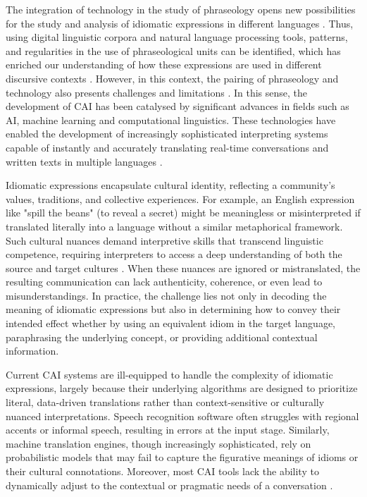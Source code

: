 The integration of technology in the study of phraseology opens new
possibilities for the study and analysis of idiomatic expressions in
different languages \cite{mogorronHuerta2012}. Thus, using digital
linguistic corpora and natural language processing tools, patterns, and
regularities in the use of phraseological units can be identified, which
has enriched our understanding of how these expressions are used in
different discursive contexts \cite{fantinuoli2017b,corpaspastorrubio2023,gaber2023b}.
However, in this context, the pairing of
phraseology and technology also presents challenges and limitations
\cite{sevillaMunoz2012}. In this sense, the development of CAI has been
catalysed by significant advances in fields such as AI, machine learning
and computational linguistics. These technologies have enabled the
development of increasingly sophisticated interpreting systems capable
of instantly and accurately translating real-time conversations and
written texts in multiple languages \cite{koponen2021,guo2023}.

Idiomatic expressions encapsulate cultural identity, reflecting a
community's values, traditions, and collective
experiences. For example, an English expression like "spill the beans"
(to reveal a secret) might be meaningless or misinterpreted if
translated literally into a language without a similar metaphorical
framework. Such cultural nuances demand interpretive skills that
transcend linguistic competence, requiring interpreters to access a deep
understanding of both the source and target cultures \cite{ramirezRodriguez2024}. 
When these nuances are ignored or mistranslated, the resulting
communication can lack authenticity, coherence, or even lead to
misunderstandings. In practice, the challenge lies not only in decoding
the meaning of idiomatic expressions but also in determining how to
convey their intended effect whether by using an equivalent idiom in the
target language, paraphrasing the underlying concept, or providing
additional contextual information.

Current CAI systems are ill-equipped to handle the complexity of
idiomatic expressions, largely because their underlying algorithms are
designed to prioritize literal, data-driven translations rather than
context-sensitive or culturally nuanced interpretations. Speech
recognition software often struggles with regional accents or informal
speech, resulting in errors at the input stage. Similarly, machine
translation engines, though increasingly sophisticated, rely on
probabilistic models that may fail to capture the figurative meanings of
idioms or their cultural connotations. Moreover, most CAI tools lack the
ability to dynamically adjust to the contextual or pragmatic needs of a
conversation \cite{corpasPastor2020,corpasPastor2022}.

